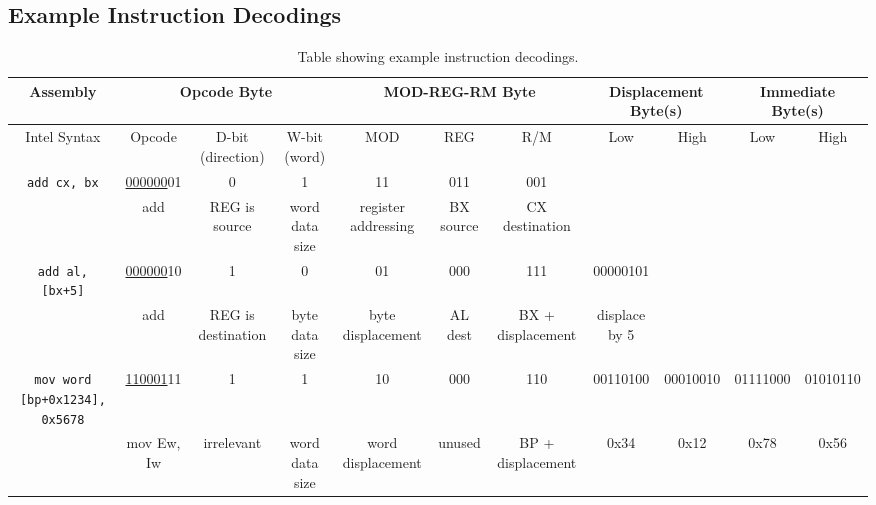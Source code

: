\begin{landscape} \section{Example Instruction Decodings}
    \begin{table}[h]
        \resizebox{0.87\paperheight}{!} {\begin{tabular} { |*{11}{c|} } %
            \hline
            Assembly & \multicolumn{3}{c}{Opcode Byte} & \multicolumn{3}{|c}{MOD-REG-RM Byte} & \multicolumn{2}{|c}{Displacement Byte(s)} & \multicolumn{2}{|c|}{Immediate Byte(s)} \\
            \hline
            Intel Syntax                            & Opcode                & D-bit (direction)     & W-bit (word)          & MOD                   & REG           & R/M               & Low           & High      & Low       & High \\
            \hline
            \texttt{add cx, bx}                     & \underline{000000}01  & 0                     & 1                     & 11                    & 011           & 001               & & & & \\
                                                    & add                   & REG is source         & word data size        & register addressing   & BX source     & CX destination    & & & & \\
            \hline
            \texttt{add al, [bx+5]}                 & \underline{000000}10  & 1                     & 0                     & 01                    & 000           & 111               & 00000101      & & & \\
                                                    & add                   & REG is destination    & byte data size        & byte displacement     & AL dest       & BX + displacement & displace by 5 & & & \\
            \hline
            \texttt{mov word [bp+0x1234], 0x5678}   & \underline{110001}11  & 1                     & 1                     & 10                    & 000           & 110               & 00110100      & 00010010  & 01111000  & 01010110 \\
                                                    & mov Ew, Iw            & irrelevant            & word data size        & word displacement     & unused        & BP + displacement & 0x34          & 0x12      & 0x78      & 0x56 \\
            \hline
        \end{tabular}}
        \caption{Table showing example instruction decodings.}
    \end{table}
\end{landscape}

